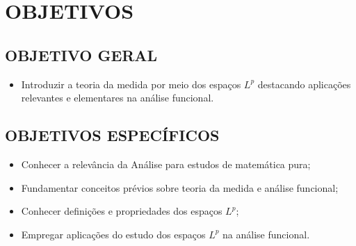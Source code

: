 \chapter{OBJETIVOS}
\section{OBJETIVO GERAL}
    \begin{itemize}
        \item Introduzir a teoria da medida por meio dos espaços $L^p$ destacando aplicações relevantes e elementares na análise funcional.
    \end{itemize}
\section{OBJETIVOS ESPECÍFICOS}
    \begin{itemize}
        \item Conhecer a relevância da Análise para estudos de matemática pura;
        \item Fundamentar conceitos prévios sobre teoria da medida e análise funcional;
        \item Conhecer definições e propriedades dos espaços $L^p$;
        \item Empregar aplicações do estudo dos espaços $L^p$ na análise funcional.
    \end{itemize}

\begin{comment}

Com o intuito de dar resposta à pergunta diretriz estabelecida, essa pesquisa possui, como objetivo geral, introduzir a teoria da medida por meio dos espaços $L^p$ destacando aplicações relevantes e elementares na análise funcional. 
Isso acarreta  na estipulação de três objetivos específicos, apresentados adiante.

O primeiro objetivo especifico é conhecer a relevância da Análise para estudos de matemática pura. 
Isso será feito por meio de um percurso histórico.
Como segundo objetivo específico planeja-se fundamentar conceitos prévios sobre teoria da medida e análise funcional, pois não é um tema comum de graduação e  deseja-se que todo todos os requisitos para entender o texto estejam contidos no próprio texto.  

O terceiro objetivo específico é o de conhecer definições e propriedades dos espaços $L^p$ e desta forma introduzir a teoria da medida.
Por fim, como quarto objetivo especifico, empregar aplicações do estudo dos espaços $L^p$ na análise funcional com a finalidade de correlacionar teoria da medida com a análise funcional.

\end{comment}
